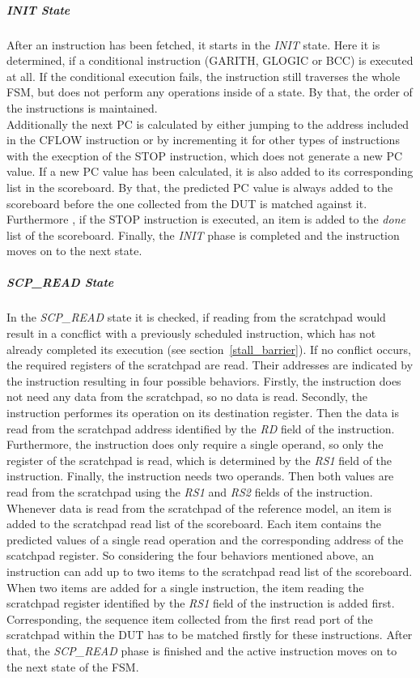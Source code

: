 \subparagraph{INIT State}

After an instruction has been fetched, it starts in the \emph{INIT} state.
Here it is determined, if a conditional instruction (GARITH, GLOGIC or BCC) is executed at all.
If the conditional execution fails, the instruction still traverses the whole FSM, but does not perform any operations inside of a state.
By that, the order of the instructions is maintained.\\
Additionally the next PC is calculated by either jumping to the address included in the CFLOW instruction or by incrementing it for other types of instructions
with the execption of the STOP instruction, which does not generate a new PC value.
If a new PC value has been calculated, it is also added to its corresponding list in the scoreboard.
By that, the predicted PC value is always added to the scoreboard before the one collected from the DUT is matched against it.
Furthermore , if the STOP instruction is executed, an item is added to the \emph{done} list of the scoreboard.
Finally, the \emph{INIT} phase is completed and the instruction moves on to the next state.

\subparagraph{SCP\_READ State}

In the \emph{SCP\_READ} state it is checked, if reading from the scratchpad would result in a concflict with a previously scheduled instruction, which has not
already completed its execution (see section~\ref{stall_barrier}).
If no conflict occurs, the required registers of the scratchpad are read.
Their addresses are indicated by the instruction resulting in four possible behaviors.
Firstly, the instruction does not need any data from the scratchpad, so no data is read.
Secondly, the instruction performes its operation on its destination register.
Then the data is read from the scratchpad address identified by the \emph{RD} field of the instruction.
Furthermore, the instruction does only require a single operand, so only the register of the scratchpad is read, which is determined by the \emph{RS1} field of
the instruction.
Finally, the instruction needs two operands.
Then both values are read from the scratchpad using the \emph{RS1} and \emph{RS2} fields of the instruction.\\
Whenever data is read from the scratchpad of the reference model, an item is added to the scratchpad read list of the scoreboard.
Each item contains the predicted values of a single read operation and the corresponding address of the scatchpad register.
So considering the four behaviors mentioned above, an instruction can add up to two items to the scratchpad read list of the scoreboard.
When two items are added for a single instruction, the item reading the scratchpad register identified by the \emph{RS1} field of the instruction is
added first.
Corresponding, the sequence item collected from the first read port of the scratchpad within the DUT has to be matched firstly for these instructions.
After that, the \emph{SCP\_READ} phase is finished and the active instruction moves on to the next state of the FSM.

